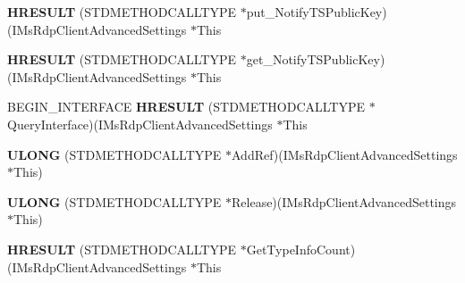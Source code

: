 \begin{DoxyCompactItemize}
\item 
\mbox{\label{struct_i_ms_rdp_client_advanced_settings_vtbl_ae91311db250369c1ec2839dcc8ad966c}} 
{\bfseries H\+R\+E\+S\+U\+LT} (S\+T\+D\+M\+E\+T\+H\+O\+D\+C\+A\+L\+L\+T\+Y\+PE $\ast$put\+\_\+\+Notify\+T\+S\+Public\+Key)(I\+Ms\+Rdp\+Client\+Advanced\+Settings $\ast$This
\item 
\mbox{\label{struct_i_ms_rdp_client_advanced_settings_vtbl_aa52218b3975040138f5653887de3558b}} 
{\bfseries H\+R\+E\+S\+U\+LT} (S\+T\+D\+M\+E\+T\+H\+O\+D\+C\+A\+L\+L\+T\+Y\+PE $\ast$get\+\_\+\+Notify\+T\+S\+Public\+Key)(I\+Ms\+Rdp\+Client\+Advanced\+Settings $\ast$This
\item 
\mbox{\label{struct_i_ms_rdp_client_advanced_settings_vtbl_abf0ca0c59176438ffe0df24050d08f62}} 
B\+E\+G\+I\+N\+\_\+\+I\+N\+T\+E\+R\+F\+A\+CE {\bfseries H\+R\+E\+S\+U\+LT} (S\+T\+D\+M\+E\+T\+H\+O\+D\+C\+A\+L\+L\+T\+Y\+PE $\ast$Query\+Interface)(I\+Ms\+Rdp\+Client\+Advanced\+Settings $\ast$This
\item 
\mbox{\label{struct_i_ms_rdp_client_advanced_settings_vtbl_ac61b681c52e09cb6d62a5cc2119c24e7}} 
{\bfseries U\+L\+O\+NG} (S\+T\+D\+M\+E\+T\+H\+O\+D\+C\+A\+L\+L\+T\+Y\+PE $\ast$Add\+Ref)(I\+Ms\+Rdp\+Client\+Advanced\+Settings $\ast$This)
\item 
\mbox{\label{struct_i_ms_rdp_client_advanced_settings_vtbl_a58d362a98c14ae214c1760d3290a9aca}} 
{\bfseries U\+L\+O\+NG} (S\+T\+D\+M\+E\+T\+H\+O\+D\+C\+A\+L\+L\+T\+Y\+PE $\ast$Release)(I\+Ms\+Rdp\+Client\+Advanced\+Settings $\ast$This)
\item 
\mbox{\label{struct_i_ms_rdp_client_advanced_settings_vtbl_a3328cf258b8be43703b7c5434a20c676}} 
{\bfseries H\+R\+E\+S\+U\+LT} (S\+T\+D\+M\+E\+T\+H\+O\+D\+C\+A\+L\+L\+T\+Y\+PE $\ast$Get\+Type\+Info\+Count)(I\+Ms\+Rdp\+Client\+Advanced\+Settings $\ast$This
\item 
\mbox{\label{struct_i_ms_rdp_client_advanced_settings_vtbl_a95197b1c29bdd034864e29e387f7d948}} 

\end{DoxyCompactItemize}
